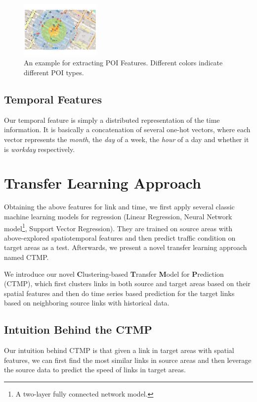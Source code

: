 \documentclass[letterpaper]{article} %
\begin{document}
\begin{figure}[t]
	\centering
	\includegraphics[width=0.35\textwidth]{figures/poi.pdf}
	\caption{{An example for extracting POI Features. Different colors indicate different POI types.}}
	\label{fig:poi}
\end{figure}


\subsection{Temporal Features}
Our temporal feature is simply a distributed representation of the time information.
It is basically a concatenation of several one-hot vectors, 
where each vector represents the \textit{month}, the \textit{day} of a week, the \textit{hour} of a day and whether it is \textit{workday} respectively. 


\section{Transfer Learning Approach}
Obtaining the above features for link and time,
we first apply several classic machine learning models for regression (Linear Regression, Neural Network model\footnote{A two-layer fully connected network model.}, Support Vector Regression).
They are trained on source areas with above-explored spatiotemporal features and then predict traffic condition on target areas as a test.
Afterwards, we present a novel transfer learning approach named CTMP.


We introduce our novel \textbf{C}lustering-based \textbf{T}ransfer \textbf{M}odel for \textbf{P}rediction  (CTMP), which first clusters links in both source and target areas based on their spatial features and then do time series based prediction for the target links based on neighboring source links with historical data.

\subsection{Intuition Behind the CTMP}
Our intuition behind CTMP is that given a link in target areas with spatial features, we can first find the most similar links in source areas and then leverage the source data to predict the speed of links in target areas.
\end{document}
